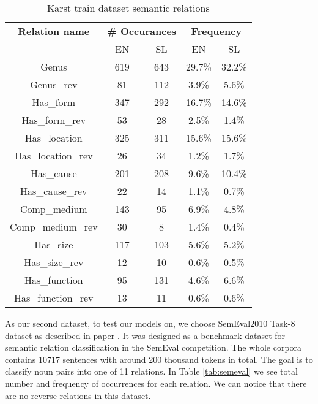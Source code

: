 \documentclass[fleqn,moreauthors,10pt]{ds_report}
\begin{document}
\begin{table}[h]
    \centering
    \begin{tabular}{|c|c|c|c|c|}
    \hline
        \textbf{Relation name} & \multicolumn{2}{|c|}{\textbf{\# Occurances}} & \multicolumn{2}{|c|}{\textbf{Frequency}} \\
        & EN & SL & EN & SL \\
        
        \hline \hline
        Genus & 619 & 643 & 29.7\% & 32.2\% \\ \hline
        Genus\_rev & 81 & 112 & 3.9\% & 5.6\% \\ \hline
        Has\_form & 347 & 292 & 16.7\% & 14.6\% \\ \hline
        Has\_form\_rev & 53 & 28 & 2.5\% & 1.4\% \\ \hline
        Has\_location & 325 & 311 & 15.6\% & 15.6\% \\ \hline
        Has\_location\_rev & 26 & 34 & 1.2\% & 1.7\% \\ \hline
        Has\_cause & 201 & 208 & 9.6\% & 10.4\% \\ \hline
        Has\_cause\_rev & 22 & 14 & 1.1\% & 0.7\% \\ \hline
        Comp\_medium \footnotemark[1] & 143 & 95 & 6.9\% & 4.8\% \\ \hline
        Comp\_medium\_rev \footnotemark[2] & 30 & 8 & 1.4\% & 0.4\% \\ \hline
        Has\_size & 117 & 103 & 5.6\% & 5.2\% \\ \hline
        Has\_size\_rev & 12 & 10 & 0.6\% & 0.5\% \\ \hline
        Has\_function & 95 & 131 & 4.6\% & 6.6\% \\ \hline
        Has\_function\_rev & 13 & 11 & 0.6\% & 0.6\% \\ \hline
    \end{tabular}
    \caption{Karst train dataset semantic relations}
    \label{tab:karst_classes}
\end{table}



\par As our second dataset, to test our models on, we choose SemEval2010 Task-8 dataset as described in paper \cite{hendrickx-etal-2010-semeval}. It was designed as a benchmark dataset for semantic relation classification in the SemEval competition. The whole corpora contains 10717 sentences with around 200 thousand tokens in total. The goal is to classify noun pairs into one of 11 relations. In Table \ref{tab:semeval} we see total number and frequency of occurrences for each relation. We can notice that there are no reverse relations in this dataset.
\end{document}
